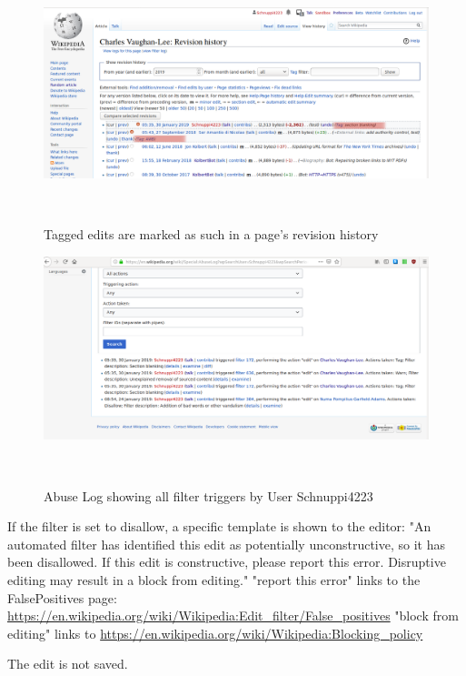 \begin{figure}
\centering
  \includegraphics[width=0.9\columnwidth]{pics/screenshots-filter-trigger/Screenshot-tags-in-revision-history.png}
  \caption{Tagged edits are marked as such in a page's revision history}~\label{fig:tags-in-history}
\end{figure}

\begin{figure}
\centering
  \includegraphics[width=0.9\columnwidth]{pics/screenshots-filter-trigger/Screenshot-abuse-log.png}
  \caption{Abuse Log showing all filter triggers by User Schnuppi4223}~\label{fig:screenshot-abuse-log}
\end{figure}

If the filter is set to disallow, a specific template is shown to the editor: "An automated filter has identified this edit as potentially unconstructive, so it has been disallowed. If this edit is constructive, please report this error. Disruptive editing may result in a block from editing."
"report this error" links to the FalsePositives page: \url{https://en.wikipedia.org/wiki/Wikipedia:Edit_filter/False_positives}
"block from editing" links to \url{https://en.wikipedia.org/wiki/Wikipedia:Blocking_policy}

The edit is not saved.

